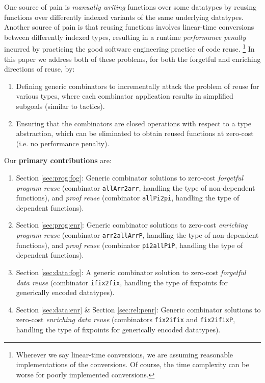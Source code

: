 \documentclass[acmsmall]{acmart}\settopmatter{}
\newcommand{\refsec}[1]{Section \ref{sec:#1}}
\begin{document}
One source of pain is \textit{manually writing} functions
over some datatypes by reusing functions over differently indexed
variants of the same underlying datatypes. Another source of pain is
that reusing functions involves linear-time conversions
between differently indexed types, resulting in a
runtime \textit{performance penalty} incurred by practicing the good software
engineering practice of code reuse. \footnote{
  Wherever we say linear-time conversions, we are assuming reasonable
  implementations of the conversions. Of course, the time complexity
  can be worse for poorly implemented conversions.
}
In this paper we address both of
these problems, for both the forgetful and enriching directions of
reuse, by:
\begin{enumerate}
\item Defining generic combinators to incrementally attack the problem
  of reuse for various types, where each combinator application
  results in simplified subgoals (similar to tactics).
\item Ensuring that the combinators are closed operations with respect to
  a type abstraction, which can be eliminated to obtain reused
  functions at zero-cost (i.e. no performance penalty).
\end{enumerate}
Our \textbf{primary contributions} are:
\begin{enumerate}
\item{\refsec{prog:fog}:} Generic combinator solutions to zero-cost
  \textit{forgetful program reuse}
  (combinator \verb;allArr2arr;, handling the type of non-dependent functions),
  and \textit{proof reuse} (combinator \verb;allPi2pi;,
  handling the type of dependent functions).
\item{\refsec{prog:enr}:} Generic combinator solutions to zero-cost
  \textit{enriching program reuse}
  (combinator \verb;arr2allArrP;, handling the type of non-dependent functions),
  and \textit{proof reuse} (combinator \verb;pi2allPiP;,
  handling the type of dependent functions).
\item{\refsec{data:fog}:} A generic combinator solution to zero-cost
  \textit{forgetful data reuse}
  (combinator \verb;ifix2fix;, handling the type of fixpoints for
  generically encoded datatypes).
\item{\refsec{data:enr} \& \refsec{rel:penr}:} Generic combinator solutions to zero-cost
  \textit{enriching data reuse}
  (combinators \verb;fix2ifix; and \verb;fix2ifixP;, handling the type of fixpoints for
  generically encoded datatypes).
\end{enumerate}
\end{document}
